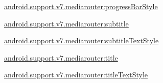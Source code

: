 {\ttfamily \hyperlink{classandroid_1_1support_1_1v7_1_1mediarouter_1_1R_1_1styleable_ac7aa56615dec1a7274eb0896d2046b20}{android.\+support.\+v7.\+mediarouter\+:progress\+Bar\+Style}}

{\ttfamily \hyperlink{classandroid_1_1support_1_1v7_1_1mediarouter_1_1R_1_1styleable_a867c4a1f26c8644959ad41993d80d123}{android.\+support.\+v7.\+mediarouter\+:subtitle}}

{\ttfamily \hyperlink{classandroid_1_1support_1_1v7_1_1mediarouter_1_1R_1_1styleable_ade41aba152cb6a37bb56550851f0ebe0}{android.\+support.\+v7.\+mediarouter\+:subtitle\+Text\+Style}}

{\ttfamily \hyperlink{classandroid_1_1support_1_1v7_1_1mediarouter_1_1R_1_1styleable_afe5e967b4606e60a2f7e266e1c18ca16}{android.\+support.\+v7.\+mediarouter\+:title}}

{\ttfamily \hyperlink{classandroid_1_1support_1_1v7_1_1mediarouter_1_1R_1_1styleable_a9d4f61dfa42033f224cea9f4b48972b9}{android.\+support.\+v7.\+mediarouter\+:title\+Text\+Style}}

